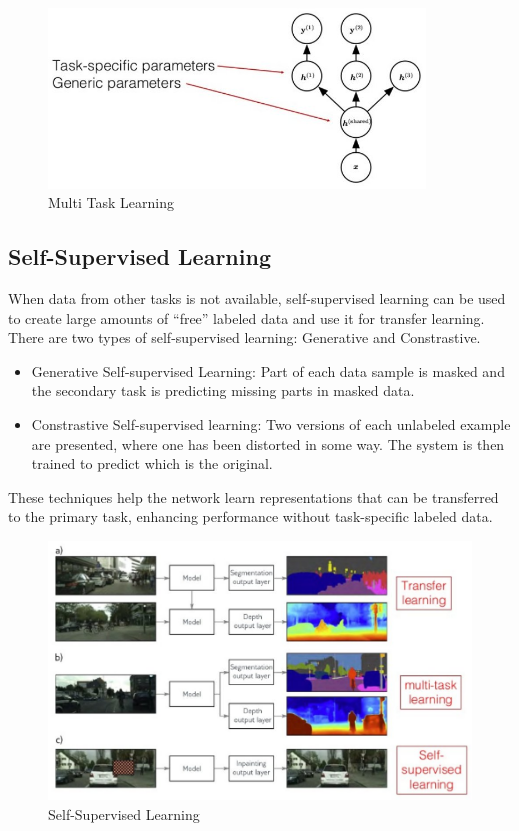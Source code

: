 \begin{figure}[htp]
    \centering
    \includegraphics[width=10cm]{Images/multi-task_learning.jpg}
    \caption{Multi Task Learning}
    \label{fig:muti-task_learning}
\end{figure}

\subsection{Self-Supervised Learning}

When data from other tasks is not available, self-supervised learning can be used to create large amounts of “free” labeled data and use it for transfer learning. There are two types of self-supervised learning: Generative and Constrastive.

\begin{itemize}
    \item Generative Self-supervised Learning: Part of each data sample is masked and the secondary task is predicting missing parts in masked data.
    \item Constrastive Self-supervised learning: Two versions of each unlabeled example are presented, where one has been distorted in some way. The system is then trained to predict which is the original.
\end{itemize}

\noindent These techniques help the network learn representations that can be transferred to the primary task, enhancing performance without task-specific labeled data.

\begin{figure}[h]
    \centering
    \includegraphics[width=13cm]{Images/self-supervised_learning.jpg}
    \caption{Self-Supervised Learning}
    \label{fig:self-supervised}
\end{figure}

